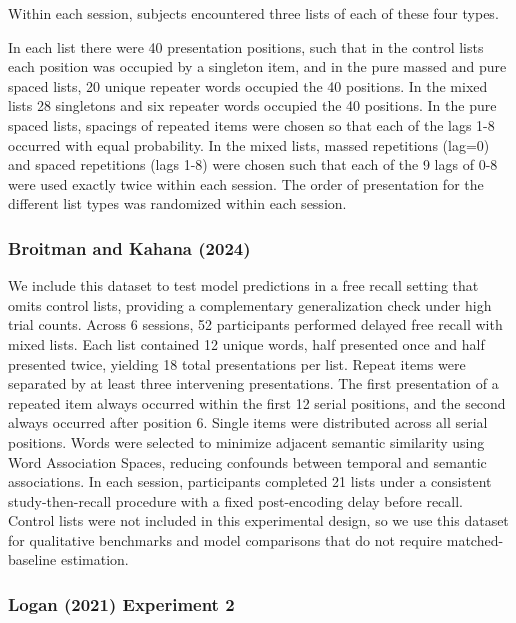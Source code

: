 \documentclass[
  letterpaper,
  11pt,
  english,
  singlespacing,
  headsepline]{MastersDoctoralThesis}
\begin{document}
Within each session, subjects encountered three lists of each of these
four types.

In each list there were 40 presentation positions, such that in the
control lists each position was occupied by a singleton item, and in the
pure massed and pure spaced lists, 20 unique repeater words occupied the
40 positions. In the mixed lists 28 singletons and six repeater words
occupied the 40 positions. In the pure spaced lists, spacings of
repeated items were chosen so that each of the lags 1-8 occurred with
equal probability. In the mixed lists, massed repetitions (lag=0) and
spaced repetitions (lags 1-8) were chosen such that each of the 9 lags
of 0-8 were used exactly twice within each session. The order of
presentation for the different list types was randomized within each
session.

\subsubsection{Broitman and Kahana (2024)}\label{broitman2024neural}

We include this dataset to test model predictions in a free recall
setting that omits control lists, providing a complementary
generalization check under high trial counts. Across 6 sessions, 52
participants performed delayed free recall with mixed lists. Each list
contained 12 unique words, half presented once and half presented twice,
yielding 18 total presentations per list. Repeat items were separated by
at least three intervening presentations. The first presentation of a
repeated item always occurred within the first 12 serial positions, and
the second always occurred after position 6. Single items were
distributed across all serial positions. Words were selected to minimize
adjacent semantic similarity using Word Association Spaces, reducing
confounds between temporal and semantic associations. In each session,
participants completed 21 lists under a consistent study-then-recall
procedure with a fixed post-encoding delay before recall. Control lists
were not included in this experimental design, so we use this dataset
for qualitative benchmarks and model comparisons that do not require
matched-baseline estimation.

\subsubsection{Logan (2021) Experiment
2}\label{logan2021serial-experiment-2}
\end{document}
